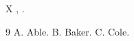 \documentclass[aps,prl]{revtex4-2}
\begin{document}
X \cite{c,a,b}, \cite{a,c}.
\begin{thebibliography}{9}
 A. Able.
 B. Baker.
 C. Cole.
\end{thebibliography}
\end{document}
